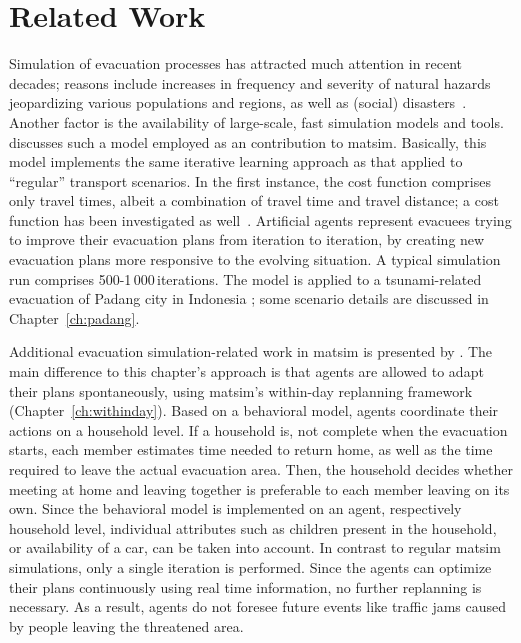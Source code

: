 \section{Related Work}
Simulation of evacuation processes has attracted much attention in recent decades; reasons include increases in frequency and severity of natural hazards jeopardizing various populations and regions, as well as (social) disasters~\citep{Rodr2006HBoDisasterResearch}. Another factor is the availability of large-scale, fast simulation models and tools. \citet{Laemmel_PhDThesis_2011} discusses such a model employed as an contribution to \gls{matsim}. Basically, this model implements the same iterative learning approach as that applied to ``regular'' transport scenarios. In the first instance, the cost function comprises only travel times, albeit a combination of travel time and travel distance; a cost function has been investigated as well~\citep{00LaemmelKluepfelNagel2009EvacPadangAtBookTimmermanns}. 
Artificial agents represent evacuees trying to improve their evacuation plans from iteration to iteration, by creating new evacuation plans more responsive to the evolving situation. 
A typical simulation run comprises 500-1\,000\,iterations. 
The model is applied to a tsunami-related evacuation of Padang city in Indonesia \citep[e.g.,][]{00TaubenboeckEtAl2012ConcludingLastMilePaperNatHazards,00GosebergEtAl2012LastLastMile}; some scenario details are discussed in Chapter~\ref{ch:padang}. 

Additional evacuation simulation-related work in \gls{matsim} is presented by \citet{Dobler_PhDThesis_2013}. The main difference to this chapter's approach is that agents are allowed to adapt their plans spontaneously, using \gls{matsim}'s within-day replanning framework \citep{DoblerEtAl_TRR_2012} (Chapter~\ref{ch:withinday}). 
Based on a behavioral model, agents coordinate their actions on a household level. If a household is, \eg not complete when the evacuation starts, each member estimates time needed to return home, as well as the time required to leave the actual evacuation area. Then, the household decides whether meeting at home and leaving together is preferable to each member leaving on its own.
Since the behavioral model is implemented on an agent, respectively household level, individual attributes such as children present in the household, or availability of a car, can be taken into account.
In contrast to regular \gls{matsim} simulations, only a single iteration is performed. Since the agents can optimize their plans continuously using real time information, no further replanning is necessary. As a result, agents do not foresee future events like traffic jams caused by people leaving the threatened area.

